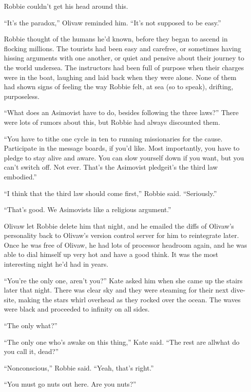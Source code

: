 Robbie couldn’t get his head around this.

“It’s the paradox,” Olivaw reminded him. “It’s not supposed to be
easy.”

Robbie thought of the humans he’d known, before they began to
ascend in flocking millions. The tourists had been easy and
carefree, or sometimes having hissing arguments with one another,
or quiet and pensive about their journey to the world undersea. The
instructors had been full of purpose when their charges were in the
boat, laughing and laid back when they were alone. None of them had
shown signs of feeling the way Robbie felt, at sea (so to speak),
drifting, purposeless.

“What does an Asimovist have to do, besides following the three
laws?” There were lots of rumors about this, but Robbie had always
discounted them.

“You have to tithe one cycle in ten to running missionaries for the
cause. Participate in the message boards, if you’d like. Most
importantly, you have to pledge to stay alive and aware. You can
slow yourself down if you want, but you can’t switch off. Not ever.
That’s the Asimovist pledge\dash{}it’s the third law embodied.”

“I think that the third law should come first,” Robbie said.
“Seriously.”

“That’s good. We Asimovists like a religious argument.”

Olivaw let Robbie delete him that night, and he emailed the diffs
of Olivaw’s personality back to Olivaw’s version control server for
him to reintegrate later. Once he was free of Olivaw, he had lots
of processor headroom again, and he was able to dial himself up
very hot and have a good think. It was the most interesting night
he’d had in years.

\tb

“You’re the only one, aren’t you?” Kate asked him when she came up
the stairs later that night. There was clear sky and they were
steaming for their next dive-site, making the stars whirl overhead
as they rocked over the ocean. The waves were black and proceeded
to infinity on all sides.

“The only what?”

“The only one who’s awake on this thing,” Kate said. “The rest are
all\dash{}what do you call it, dead?”

“Nonconscious,” Robbie said. “Yeah, that’s right.”

“You must go nuts out here. Are you nuts?”

